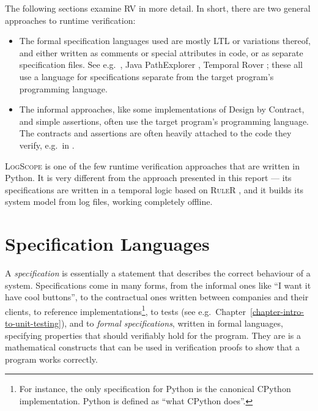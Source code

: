 The following sections examine RV in more detail. In short, there are two
general approaches to runtime verification:

\begin{itemize}

\item The formal specification languages used are mostly LTL or variations
  thereof, and either written as comments or special attributes in code, or as
  separate specification files. See e.g.\
  \cite{bauer06monitoring,bodden05efficientrv,kahkonen09lime}, Java
  PathExplorer \cite{havelund04jpax}, Temporal Rover
  \cite{drusinsky00temporalrover}; these all use a language for specifications
  separate from the target program's programming language.

\item The informal approaches, like some implementations of Design by Contract,
  and simple assertions, often use the target program's programming language.
  The contracts and assertions are often heavily attached to the code they
  verify, e.g.\ in \cite{bartetzko01jass,meyer92applyingdbc}.

\end{itemize}

\textsc{LogScope} \cite{barringer09tutorial} is one of the few runtime
verification approaches that are written in Python. It is very different from
the approach presented in this report --- its specifications are written in a
temporal logic based on \textsc{RuleR} \cite{barringer07ruler}, and it builds
its system model from log files, working completely offline.


\section{Specification Languages} \label{section-specifications}

A \textit{specification} is essentially a statement that describes the correct
behaviour of a system. Specifications come in many forms, from the informal
ones like ``I want it have cool buttons'', to the contractual ones written
between companies and their clients, to reference implementations\footnote{For
instance, the only specification for Python is the canonical CPython
implementation. Python is defined as ``what CPython does''.}, to tests (see
e.g.\ Chapter~\ref{chapter-intro-to-unit-testing}), and to \textit{formal
specifications}, written in formal languages, specifying properties that should
verifiably hold for the program. They are is a mathematical constructs that can
be used in verification proofs to show that a program works correctly.

